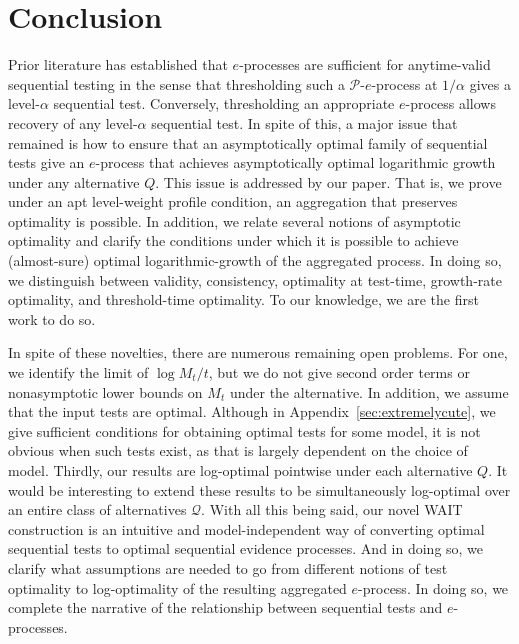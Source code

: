 \documentclass{article}
\newcommand{\PP}{\mathcal P}
\theoremstyle{definition}
\begin{document}
\section{Conclusion}\label{sec:cutestest}
Prior literature has established that $e$-processes are sufficient for anytime-valid sequential testing in the sense that thresholding such a $\PP$-$e$-process at $1/\alpha$ gives a level-$\alpha$ sequential test. Conversely, thresholding an appropriate $e$-process allows recovery of any level-$\alpha$ sequential test. In spite of this, a major issue that remained is how to ensure that an asymptotically optimal family of sequential tests give an $e$-process that achieves asymptotically optimal logarithmic growth under any alternative $Q$. This issue is addressed by our paper. That is, we prove under an apt level-weight profile condition, an aggregation that preserves optimality is possible. In addition, we relate several notions of asymptotic optimality and clarify the conditions under which it is possible to achieve (almost-sure) optimal logarithmic-growth of the aggregated process. In doing so, we distinguish between validity, consistency, optimality at test-time, growth-rate optimality, and threshold-time optimality. To our knowledge, we are the first work to do so.

In spite of these novelties, there are numerous remaining open problems. For one, we identify the limit of $\log M_t/t$, but we do not give second order terms or nonasymptotic lower bounds on $M_t$ under the alternative. In addition, we assume that the input tests are optimal. Although in Appendix~\ref{sec:extremelycute}, we give sufficient conditions for obtaining optimal tests for some model, it is not obvious when such tests exist, as that is largely dependent on the choice of model. Thirdly, our results are log-optimal pointwise under each alternative $Q$. It would be interesting to extend these results to be simultaneously log-optimal over an entire class of alternatives $\mathcal Q$. With all this being said, our novel WAIT construction is an intuitive and model-independent way of converting optimal sequential tests to optimal sequential evidence processes. And in doing so, we clarify what assumptions are needed to go from different notions of test optimality to log-optimality of the resulting aggregated $e$-process. In doing so, we complete the narrative of the relationship between sequential tests and $e$-processes.



\end{document}

